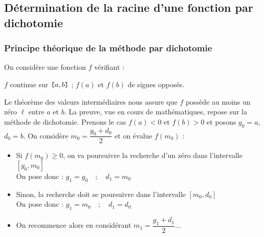 \subsection{Détermination de la racine d'une fonction par dichotomie}

\subsubsection{Principe théorique de la méthode par dichotomie}
On considère une fonction $f$ vérifiant : 
\begin{center} $f$ continue sur $\verb![!a,b\verb!]!$ ;  $f(a)$ et $f(b)$ de signes opposés.
\end{center} Le théorème des valeurs intermédiaires nous assure que $f$ possède au moins un zéro $\ell$ entre $a$ et $b$. La preuve, vue en cours de mathématiques, repose sur la méthode de dichotomie. Prenons le cas $f(a)<0$ et $f(b)>0$ et posons $g_0=a$, $d_0=b$. 
 On considère $m_0 = \dfrac{g_0+d_0}{2}$ et on évalue $f(m_0)$ : 
\begin{itemize}
 \item Si $f(m_0)\geq 0$, on va poursuivre la recherche d'un zéro dans l'intervalle  {$[g_0,m_0]$} \\On pose donc  : 
 $g_1 =  {g_0} \quad ;\quad  d_1 =  {m_0}$\vspace*{2mm}
  \item Sinon,  la recherche doit se poursuivre  dans l'intervalle  {$[m_0,d_0]$} \\ On pose donc  : 
 $g_1 =  {m_0} \quad ; \quad d_1 =  {d_0}$\vspace*{2mm}
 \item On recommence alors en considérant $m_1 = \dfrac{g_1+d_1}{2}$...\\
 \end{itemize}


